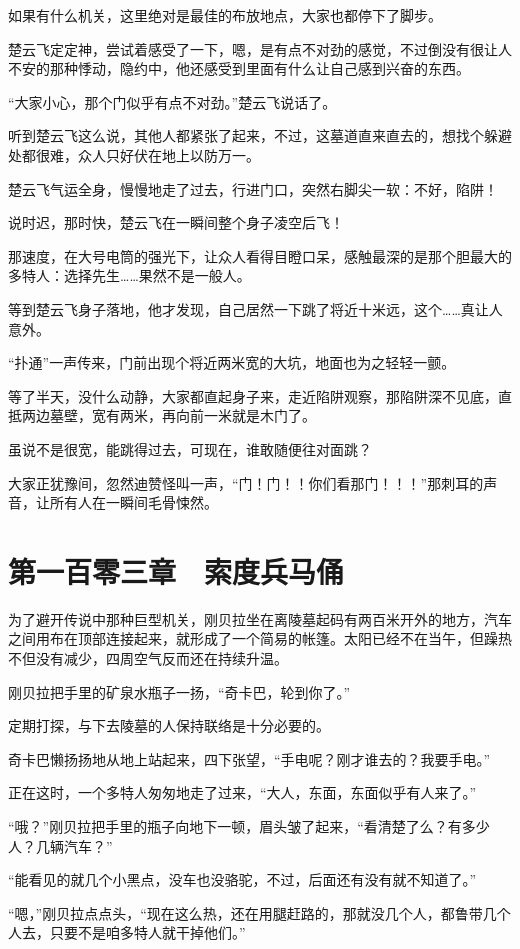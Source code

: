 如果有什么机关，这里绝对是最佳的布放地点，大家也都停下了脚步。

楚云飞定定神，尝试着感受了一下，嗯，是有点不对劲的感觉，不过倒没有很让人不安的那种悸动，隐约中，他还感受到里面有什么让自己感到兴奋的东西。

“大家小心，那个门似乎有点不对劲。”楚云飞说话了。

听到楚云飞这么说，其他人都紧张了起来，不过，这墓道直来直去的，想找个躲避处都很难，众人只好伏在地上以防万一。

楚云飞气运全身，慢慢地走了过去，行进门口，突然右脚尖一软：不好，陷阱！

说时迟，那时快，楚云飞在一瞬间整个身子凌空后飞！

那速度，在大号电筒的强光下，让众人看得目瞪口呆，感触最深的是那个胆最大的多特人：选择先生……果然不是一般人。

等到楚云飞身子落地，他才发现，自己居然一下跳了将近十米远，这个……真让人意外。

“扑通”一声传来，门前出现个将近两米宽的大坑，地面也为之轻轻一颤。

等了半天，没什么动静，大家都直起身子来，走近陷阱观察，那陷阱深不见底，直抵两边墓壁，宽有两米，再向前一米就是木门了。

虽说不是很宽，能跳得过去，可现在，谁敢随便往对面跳？

大家正犹豫间，忽然迪赞怪叫一声，“门！门！！你们看那门！！！”那刺耳的声音，让所有人在一瞬间毛骨悚然。

\section{第一百零三章　索度兵马俑}

为了避开传说中那种巨型机关，刚贝拉坐在离陵墓起码有两百米开外的地方，汽车之间用布在顶部连接起来，就形成了一个简易的帐篷。太阳已经不在当午，但躁热不但没有减少，四周空气反而还在持续升温。

刚贝拉把手里的矿泉水瓶子一扬，“奇卡巴，轮到你了。”

定期打探，与下去陵墓的人保持联络是十分必要的。

奇卡巴懒扬扬地从地上站起来，四下张望，“手电呢？刚才谁去的？我要手电。”

正在这时，一个多特人匆匆地走了过来，“大人，东面，东面似乎有人来了。”

“哦？”刚贝拉把手里的瓶子向地下一顿，眉头皱了起来，“看清楚了么？有多少人？几辆汽车？”

“能看见的就几个小黑点，没车也没骆驼，不过，后面还有没有就不知道了。”

“嗯，”刚贝拉点点头，“现在这么热，还在用腿赶路的，那就没几个人，都鲁带几个人去，只要不是咱多特人就干掉他们。”

